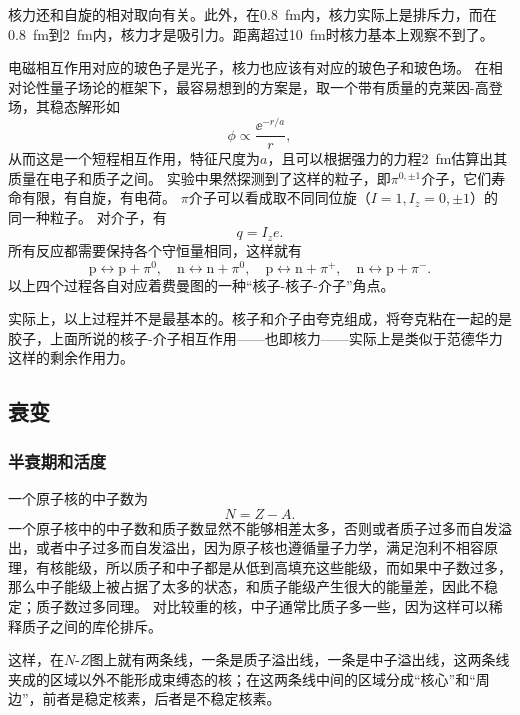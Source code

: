 核力还和自旋的相对取向有关。此外，在\SI{0.8}{fm}内，核力实际上是排斥力，而在\SI{0.8}{fm}到\SI{2}{fm}内，核力才是吸引力。距离超过\SI{10}{fm}时核力基本上观察不到了。

电磁相互作用对应的玻色子是光子，核力也应该有对应的玻色子和玻色场。
在相对论性量子场论的框架下，最容易想到的方案是，取一个带有质量的克莱因-高登场，其稳态解形如
\[
    \phi \propto \frac{\ee^{- r / a}}{r},
\]
从而这是一个短程相互作用，特征尺度为$a$，且可以根据强力的力程\SI{2}{fm}估算出其质量在电子和质子之间。
实验中果然探测到了这样的粒子，即$\pi^{0, \pm 1}$介子，它们寿命有限，有自旋，有电荷。
$\pi$介子可以看成取不同同位旋（$I=1,I_z=0, \pm 1$）的同一种粒子。
对介子，有
\begin{equation}
    q = I_z e.
\end{equation}
所有反应都需要保持各个守恒量相同，这样就有
\[
    \text{p} \longleftrightarrow \text{p} + \pi^0, \quad \text{n} \longleftrightarrow \text{n} + \pi^0, \quad \text{p} \longleftrightarrow \text{n} + \pi^+, \quad \text{n} \longleftrightarrow \text{p} + \pi^-. 
\]
以上四个过程各自对应着费曼图的一种“核子-核子-介子”角点。

实际上，以上过程并不是最基本的。核子和介子由夸克组成，将夸克粘在一起的是胶子，上面所说的核子-介子相互作用——也即核力——实际上是类似于范德华力这样的剩余作用力。

\subsection{衰变}

\subsubsection{半衰期和活度}

一个原子核的中子数为
\begin{equation}
    N = Z - A.
\end{equation}
一个原子核中的中子数和质子数显然不能够相差太多，否则或者质子过多而自发溢出，或者中子过多而自发溢出，因为原子核也遵循量子力学，满足泡利不相容原理，有核能级，所以质子和中子都是从低到高填充这些能级，而如果中子数过多，那么中子能级上被占据了太多的状态，和质子能级产生很大的能量差，因此不稳定；质子数过多同理。
对比较重的核，中子通常比质子多一些，因为这样可以稀释质子之间的库伦排斥。

这样，在$N$-$Z$图上就有两条线，一条是质子溢出线，一条是中子溢出线，这两条线夹成的区域以外不能形成束缚态的核；在这两条线中间的区域分成“核心”和“周边”，前者是稳定核素，后者是不稳定核素。

